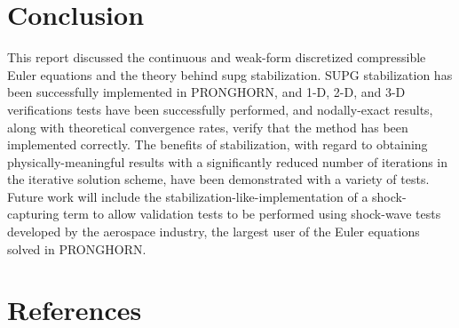 \documentclass[10pt]{article}
\numberwithin{equation}{section} %
\begin{document}
\section{Conclusion}

This report discussed the continuous and weak-form discretized compressible Euler equations and the theory behind \gls{supg} stabilization. SUPG stabilization has been successfully implemented in PRONGHORN, and 1-D, 2-D, and 3-D verifications tests have been successfully performed, and nodally-exact results, along with theoretical convergence rates, verify that the method has been implemented correctly. The benefits of stabilization, with regard to obtaining physically-meaningful results with a significantly reduced number of iterations in the iterative solution scheme, have been demonstrated with a variety of tests. Future work will include the stabilization-like-implementation of a shock-capturing term to allow validation tests to be performed using shock-wave tests developed by the aerospace industry, the largest user of the Euler equations solved in PRONGHORN. 

\section{References}
\end{document}
